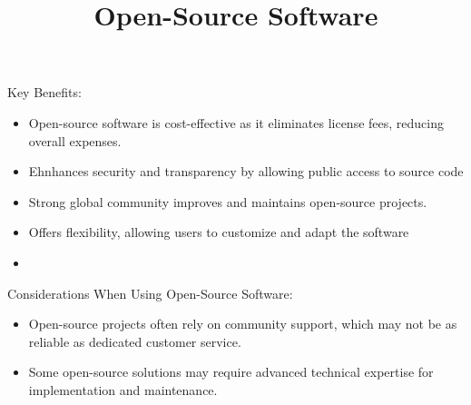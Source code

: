 \documentclass[11pt,a4paper]{article}
\title{Open-Source Software}
\begin{document}
\maketitle

Key Benefits:

\begin{itemize}
\item Open-source software is cost-effective as it eliminates license fees, reducing overall expenses.
\item Ehnhances security and transparency by allowing public access to source code
\item Strong global community improves and maintains open-source projects.
\item Offers flexibility, allowing users to customize and adapt the software
\item 
\end{itemize}

Considerations When Using Open-Source Software:

\begin{itemize}
\item Open-source projects often rely on community support, which may not be as reliable as dedicated customer service.
\item Some open-source solutions may require advanced technical expertise for implementation and maintenance.
\end{itemize}
\end{document}
